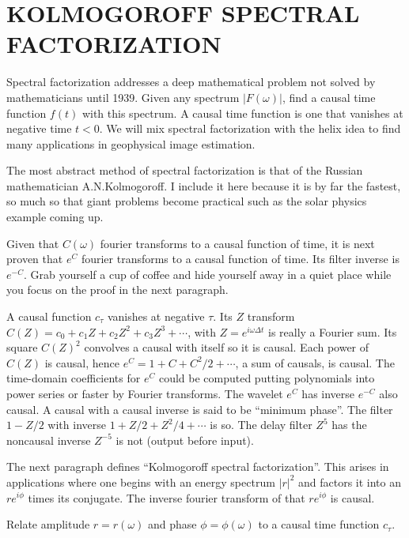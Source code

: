\section{KOLMOGOROFF SPECTRAL FACTORIZATION}
Spectral factorization addresses a deep mathematical problem not solved
by mathematicians until 1939.
Given any spectrum $|F(\omega)|$,
find a causal time function $f(t)$ with this spectrum.
A causal time function is one that vanishes at negative time $t<0$.
We will mix spectral factorization with the helix idea to find many applications
in geophysical image estimation.
\par
The most abstract method of spectral factorization is that of the Russian mathematician A.N.Kolmogoroff.
I include it here because it is by far the fastest,
so much so that giant problems become practical
such as the solar physics example coming up.
\par
Given that $C(\omega)$ fourier transforms to a causal function of time,
it is next proven that $e^C$ fourier transforms to a causal function of time.
Its filter inverse is $e^{-C}$.
Grab yourself a cup of coffee
and hide yourself away in a quiet place
while you focus on the proof in the next paragraph.
\par
A causal function $c_\tau$ vanishes at negative $\tau$.
Its $Z$ transform $C(Z) = c_0 + c_1 Z + c_2 Z^2 + c_3 Z^3 +\cdots$,
with $Z=e^{i\omega\Delta t}$ is really a Fourier sum.
Its square $C(Z)^2$
convolves a causal with itself so it is causal.
Each power of $C(Z)$ is causal, hence
$e^C=1+C+C^2/2+\cdots$, a sum of causals, is causal.
The time-domain coefficients for $e^C$ could be computed
putting polynomials into power series or faster by Fourier transforms.
The wavelet $e^C$ has inverse $e^{-C}$ also causal.
A causal with a causal inverse is said to be ``minimum phase''.
The filter $1-Z/2$ with inverse $1+Z/2+Z^2/4+\cdots$ is so.
The delay filter $Z^5$ has the noncausal inverse $Z^{-5}$ is not
(output before input).
\par
The next paragraph defines ``Kolmogoroff spectral factorization''.
This arises in applications where one begins with an energy spectrum $|r|^2$
and factors it into an $r e^{i\phi}$ times its conjugate.
The inverse fourier transform of that  $r e^{i\phi}$ is causal.
\par
Relate amplitude $r=r(\omega)$ and phase $\phi=\phi(\omega)$
to a causal time function $c_\tau$.


